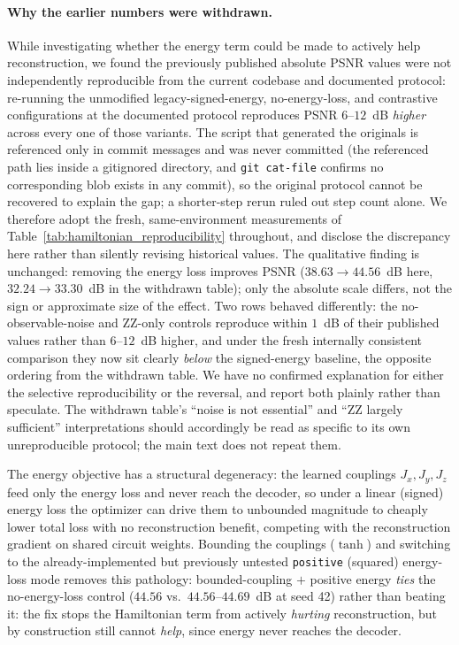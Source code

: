 \documentclass[11pt]{article}
\begin{document}
\paragraph{Why the earlier numbers were withdrawn.}\label{sec:hamiltonian_followup} While investigating whether the energy term could be made to actively help reconstruction, we found the previously published absolute PSNR values were not independently reproducible from the current codebase and documented protocol: re-running the unmodified legacy-signed-energy, no-energy-loss, and contrastive configurations at the documented protocol reproduces PSNR $6$--$12$~dB \emph{higher} across every one of those variants. The script that generated the originals is referenced only in commit messages and was never committed (the referenced path lies inside a gitignored directory, and \texttt{git cat-file} confirms no corresponding blob exists in any commit), so the original protocol cannot be recovered to explain the gap; a shorter-step rerun ruled out step count alone. We therefore adopt the fresh, same-environment measurements of Table~\ref{tab:hamiltonian_reproducibility} throughout, and disclose the discrepancy here rather than silently revising historical values. The qualitative finding is unchanged: removing the energy loss improves PSNR ($38.63\rightarrow44.56$~dB here, $32.24\rightarrow33.30$~dB in the withdrawn table); only the absolute scale differs, not the sign or approximate size of the effect. Two rows behaved differently: the no-observable-noise and ZZ-only controls reproduce within $1$~dB of their published values rather than $6$--$12$~dB higher, and under the fresh internally consistent comparison they now sit clearly \emph{below} the signed-energy baseline, the opposite ordering from the withdrawn table. We have no confirmed explanation for either the selective reproducibility or the reversal, and report both plainly rather than speculate. The withdrawn table's ``noise is not essential'' and ``ZZ largely sufficient'' interpretations should accordingly be read as specific to its own unreproducible protocol; the main text does not repeat them.

The energy objective has a structural degeneracy: the learned couplings $J_x,J_y,J_z$ feed only the energy loss and never reach the decoder, so under a linear (signed) energy loss the optimizer can drive them to unbounded magnitude to cheaply lower total loss with no reconstruction benefit, competing with the reconstruction gradient on shared circuit weights. Bounding the couplings ($\tanh$) and switching to the already-implemented but previously untested \texttt{positive} (squared) energy-loss mode removes this pathology: bounded-coupling $+$ positive energy \emph{ties} the no-energy-loss control ($44.56$ vs.\ $44.56$--$44.69$~dB at seed 42) rather than beating it: the fix stops the Hamiltonian term from actively \emph{hurting} reconstruction, but by construction still cannot \emph{help}, since energy never reaches the decoder.
\end{document}
